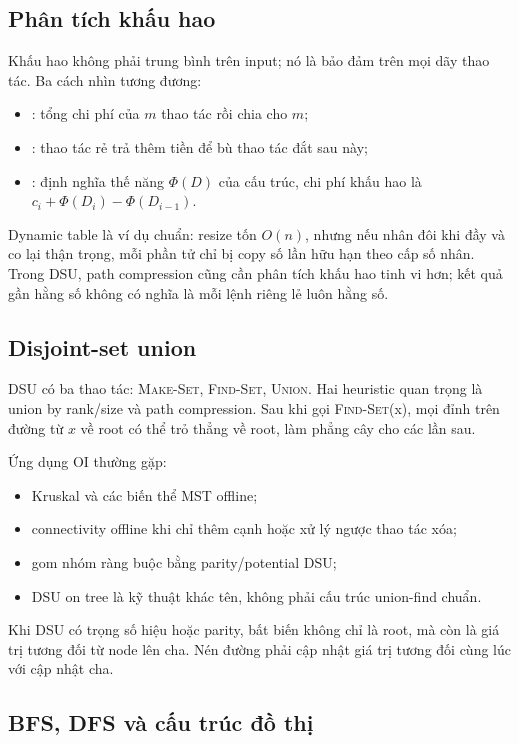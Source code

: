 \documentclass[11pt]{article}
\begin{document}
\subsection{Phân tích khấu hao}

Khấu hao không phải trung bình trên input; nó là bảo đảm trên mọi dãy thao tác.
Ba cách nhìn tương đương:
\begin{itemize}
  \item {}: tổng chi phí của \(m\) thao tác rồi chia cho \(m\);
  \item {}: thao tác rẻ trả thêm tiền để bù thao tác đắt sau này;
  \item {}: định nghĩa thế năng \(\Phi(D)\) của cấu trúc, chi phí
        khấu hao là \(c_i+\Phi(D_i)-\Phi(D_{i-1})\).
\end{itemize}

Dynamic table là ví dụ chuẩn: resize tốn \(O(n)\), nhưng nếu nhân đôi khi đầy và
co lại thận trọng, mỗi phần tử chỉ bị copy số lần hữu hạn theo cấp số nhân.
Trong DSU, path compression cũng cần phân tích khấu hao tinh vi hơn; kết quả
gần hằng số không có nghĩa là mỗi lệnh riêng lẻ luôn hằng số.

\subsection{Disjoint-set union}

DSU có ba thao tác: \textsc{Make-Set}, \textsc{Find-Set}, \textsc{Union}. Hai
heuristic quan trọng là union by rank/size và path compression. Sau khi gọi
\textsc{Find-Set}(x), mọi đỉnh trên đường từ \(x\) về root có thể trỏ thẳng về
root, làm phẳng cây cho các lần sau.

Ứng dụng OI thường gặp:
\begin{itemize}
  \item Kruskal và các biến thể MST offline;
  \item connectivity offline khi chỉ thêm cạnh hoặc xử lý ngược thao tác xóa;
  \item gom nhóm ràng buộc bằng parity/potential DSU;
  \item DSU on tree là kỹ thuật khác tên, không phải cấu trúc union-find chuẩn.
\end{itemize}
Khi DSU có trọng số hiệu hoặc parity, bất biến không chỉ là root, mà còn là giá
trị tương đối từ node lên cha. Nén đường phải cập nhật giá trị tương đối cùng
lúc với cập nhật cha.

\subsection{BFS, DFS và cấu trúc đồ thị}
\end{document}
